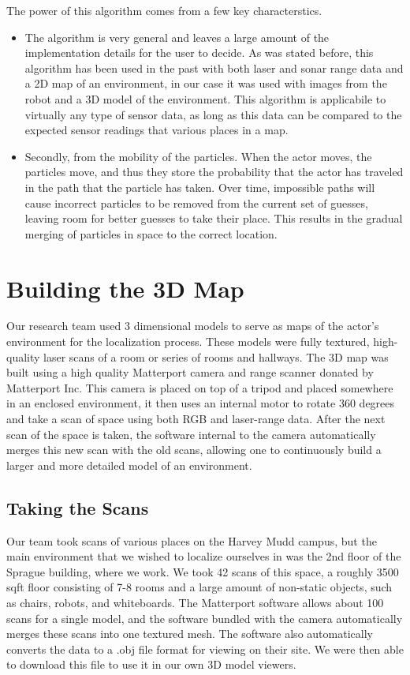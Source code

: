 \documentclass[a4paper,11pt]{article}
\begin{document}
The power of this algorithm comes from a few key characterstics. 
\begin{itemize}
 \item The algorithm is very general and leaves a large amount of the implementation details for the user to decide. As was stated before, this algorithm has been used in the past with both laser and sonar range data and a 2D map of an environment, in our case it was used with images from the robot and a 3D model of the environment. This algorithm is applicabile to virtually any type of sensor data, as long as this data can be compared to the expected sensor readings that various places in a map. 
 \item Secondly, from the mobility of the particles. When the actor moves, the particles move, and thus they store the probability that the actor has traveled in the path that the particle has taken. Over time, impossible paths will cause incorrect particles to be removed from the current set of guesses, leaving room for better guesses to take their place. This results in the gradual merging of particles in space to the correct location.
\end{itemize}


  \section{Building the 3D Map}
  Our research team used 3 dimensional models to serve as maps of the actor's environment for the localization process. These models were fully textured, high-quality laser scans of a room or series of rooms and hallways. The 3D map was built using a high quality Matterport camera and range scanner donated by Matterport Inc. This camera is placed on top of a tripod and placed somewhere in an enclosed environment, it then uses an internal motor to rotate 360 degrees and take a scan of space using both RGB and laser-range data. After the next scan of the space is taken, the software internal to the camera automatically merges this new scan with the old scans, allowing one to continuously build a larger and more detailed model of an environment.
  
  \subsection{Taking the Scans}
 Our team took scans of various places on the Harvey Mudd campus, but the main environment that we wished to localize ourselves in was the 2nd floor of the Sprague building, where we work. We took 42 scans of this space, a roughly 3500 sqft floor consisting of 7-8 rooms and a large amount of non-static objects, such as chairs, robots, and whiteboards. The Matterport software allows about 100 scans for a single model, and the software bundled with the camera automatically merges these scans into one textured mesh. The software also automatically converts the data to a .obj file format for viewing on their site. We were then able to download this file to use it in our own 3D model viewers. 
\end{document}
